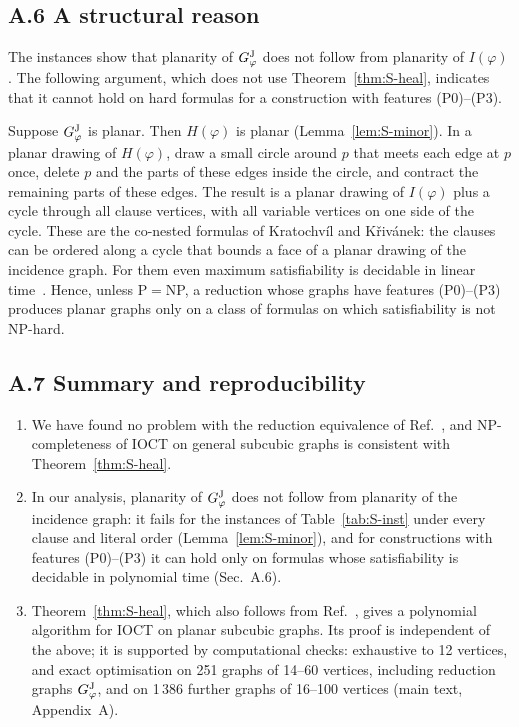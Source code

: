 \documentclass[aps,pre,onecolumn,nofootinbib]{revtex4-2}
\theoremstyle{remark}
\begin{document}
\subsection*{A.6 A structural reason}

The instances show that planarity of $G^{\rm J}_\varphi$ does not follow from planarity of $I(\varphi)$.
The following argument, which does not use Theorem~\ref{thm:S-heal}, indicates that it cannot hold
on hard formulas for a construction with features (P0)--(P3).

Suppose $G^{\rm J}_\varphi$ is planar. Then $H(\varphi)$ is planar (Lemma~\ref{lem:S-minor}). In a planar
drawing of $H(\varphi)$, draw a small circle around $p$ that meets each edge at $p$ once, delete $p$
and the parts of these edges inside the circle, and contract the remaining parts of these edges.
The result is a planar drawing of $I(\varphi)$ plus a cycle through all clause vertices, with all
variable vertices on one side of the cycle. These are the co-nested formulas of
Kratochv\'il and K\v{r}iv\'anek: the clauses can be ordered along a cycle that bounds a face of
a planar drawing of the incidence graph. For them even maximum satisfiability is decidable in
linear time~\cite{KratochvilKrivanek1993}. Hence, unless P${}={}$NP, a reduction
whose graphs have features (P0)--(P3) produces planar graphs only on a class of formulas on which
satisfiability is not NP-hard.

\subsection*{A.7 Summary and reproducibility}

\begin{enumerate}
\item We have found no problem with the reduction equivalence of Ref.~\cite{Johnson2025}, and
NP-completeness of IOCT on general subcubic graphs is consistent with Theorem~\ref{thm:S-heal}.
\item In our analysis, planarity of $G^{\rm J}_\varphi$ does not follow from planarity of the incidence
graph: it fails for the instances of Table~\ref{tab:S-inst} under every clause and literal order
(Lemma~\ref{lem:S-minor}), and for constructions with features (P0)--(P3) it can hold only on
formulas whose satisfiability is decidable in polynomial time (Sec.~A.6).
\item Theorem~\ref{thm:S-heal}, which also follows from Ref.~\cite{Akbari2022}, gives a polynomial
algorithm for IOCT on planar subcubic graphs. Its proof is independent of the above; it is supported by computational checks: exhaustive to 12
vertices, and exact optimisation on 251 graphs of 14--60 vertices, including reduction graphs
$G^{\rm J}_\varphi$, and on 1\,386 further graphs of 16--100 vertices (main text, Appendix~A).
\end{enumerate}
\end{document}
